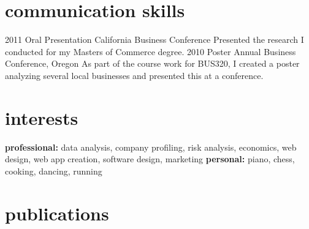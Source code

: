\documentclass[]{friggeri-cv} %
\begin{document}

\section{communication skills}

\begin{entrylist}
\entry
{2011}
{Oral Presentation}
{California Business Conference}
{Presented the research I conducted for my Masters of Commerce degree.}
\entry
{2010}
{Poster}
{Annual Business Conference, Oregon}
{As part of the course work for BUS320, I created a poster analyzing several local businesses and presented this at a conference.}
\end{entrylist}


\section{interests}

\textbf{professional:} data analysis, company profiling, risk analysis, economics, web design, web app creation, software design, marketing \textbf{personal:} piano, chess, cooking, dancing, running


\section{publications}



\begin{refsection} %
\nocite{*}
\printbibliography[sorting=chronological, type=inproceedings, title={international peer-reviewed conferences/proceedings}, notkeyword={france}, heading=subbibliography]
\end{refsection}
\end{document}
